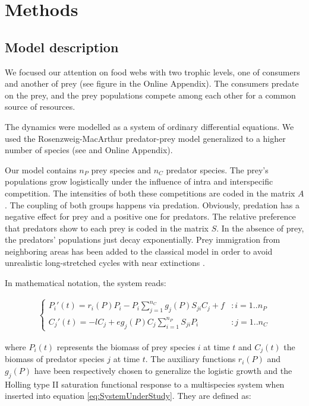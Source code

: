 \section{Methods}
\label{sec:Methods}

\subsection{Model description}
\label{subsec:Model}

We focused our attention on food webs with two trophic levels, one of consumers and another of prey (see figure in the Online Appendix). The consumers predate on the prey, and the prey populations compete among each other for a common source of resources. 

The dynamics were modelled as a system of ordinary differential equations. We used the Rosenzweig-MacArthur predator-prey model \cite{Rosenzweig1963} generalized to a higher number of species (see \cite{Scheffer2004} and Online Appendix). 

Our model contains $n_P$ prey species and $n_C$ predator species. The prey's populations grow logistically under the influence of intra and interspecific competition. The intensities of both these competitions are coded in the matrix $A$. The coupling of both groups happens via predation. Obviously, predation has a negative effect for prey and a positive one for predators. The relative preference that predators show to each prey is coded in the matrix $S$. In the absence of prey, the predators' populations just decay exponentially. Prey immigration from neighboring areas has been added to the classical model in order to avoid unrealistic long-stretched cycles with near extinctions \cite{Scheffer2004}.

In mathematical notation, the system reads:

\begin{eqnarray}
\label{eq:SystemUnderStudy}
	\begin{cases} 
	P_i'(t) =  r_i(P) P_i  - P_i \sum_{j = 1}^{n_C} g_j(P) S_{ji} C_j + f & : i = 1..n_P
	\\
	C_j'(t) = - l C_j +  e g_j(P) C_j \sum_{i = 1}^{n_P} S_{ji} P_i & : j = 1..n_C
	\end{cases}
\end{eqnarray}

where $P_i(t)$ represents the biomass of prey species $i$ at time $t$ and $C_j(t)$ the biomass of predator species $j$ at time $t$. The auxiliary functions $r_i(P)$ and $g_j(P)$ have been respectively chosen to generalize the logistic growth and the Holling type II saturation functional response \cite{Edelstein-Keshet} to a multispecies system when inserted into equation \ref{eq:SystemUnderStudy}. They are defined as:

